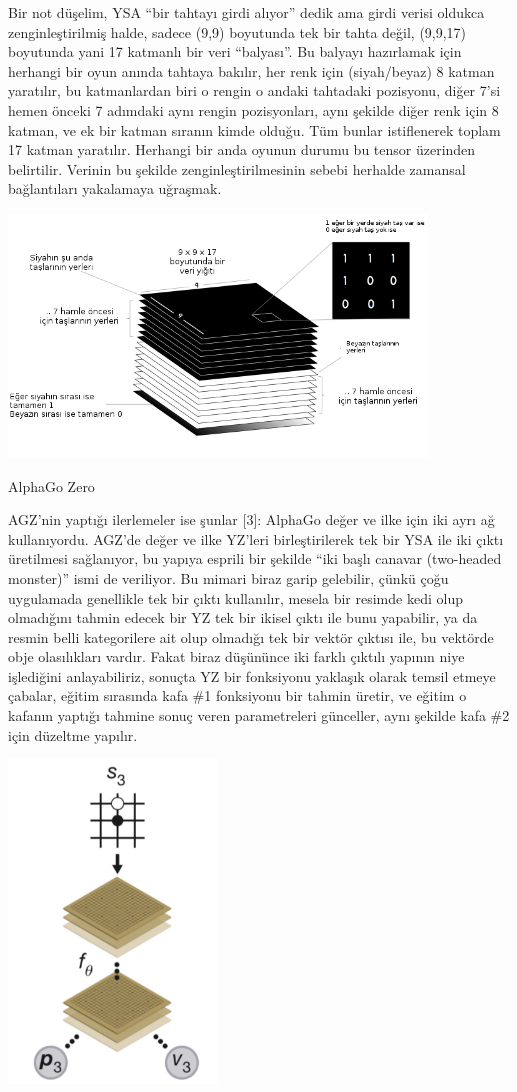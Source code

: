 \documentclass[12pt,fleqn]{article}\usepackage{../../common}
\begin{document}
Bir not düşelim, YSA ``bir tahtayı girdi alıyor'' dedik ama girdi verisi
oldukca zenginleştirilmiş halde, sadece (9,9) boyutunda tek bir tahta
değil, (9,9,17) boyutunda yani 17 katmanlı bir veri ``balyası''. Bu balyayı
hazırlamak için herhangi bir oyun anında tahtaya bakılır, her renk için
(siyah/beyaz) 8 katman yaratılır, bu katmanlardan biri o rengin o andaki
tahtadaki pozisyonu, diğer 7'si hemen önceki 7 adımdaki aynı rengin
pozisyonları, aynı şekilde diğer renk için 8 katman, ve ek bir katman
sıranın kimde olduğu. Tüm bunlar istiflenerek toplam 17 katman
yaratılır. Herhangi bir anda oyunun durumu bu tensor üzerinden
belirtilir. Verinin bu şekilde zenginleştirilmesinin sebebi herhalde
zamansal bağlantıları yakalamaya uğraşmak. 

\includegraphics[width=30em]{go_01.png}

AlphaGo Zero

AGZ'nin yaptığı ilerlemeler ise şunlar [3]: AlphaGo değer ve ilke için iki
ayrı ağ kullanıyordu. AGZ'de değer ve ilke YZ'leri birleştirilerek tek bir
YSA ile iki çıktı üretilmesi sağlanıyor, bu yapıya esprili bir şekilde
``iki başlı canavar (two-headed monster)'' ismi de veriliyor. Bu mimari
biraz garip gelebilir, çünkü çoğu uygulamada genellikle tek bir çıktı
kullanılır, mesela bir resimde kedi olup olmadığını tahmin edecek bir YZ
tek bir ikisel çıktı ile bunu yapabilir, ya da resmin belli kategorilere
ait olup olmadığı tek bir vektör çıktısı ile, bu vektörde obje olasılıkları
vardır. Fakat biraz düşününce iki farklı çıktılı yapının niye işlediğini
anlayabiliriz, sonuçta YZ bir fonksiyonu yaklaşık olarak temsil etmeye
çabalar, eğitim sırasında kafa \#1 fonksiyonu bir tahmin üretir, ve eğitim
o kafanın yaptığı tahmine sonuç veren parametreleri günceller, aynı şekilde
kafa \#2 için düzeltme yapılır.

\includegraphics[width=15em]{go_03.png}
\end{document}
